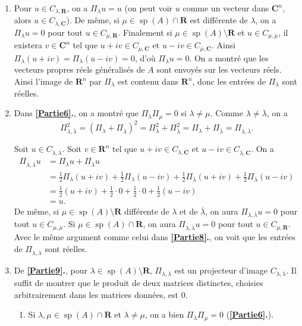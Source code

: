 \documentclass[french, 12pt]{article}
\theoremstyle{definition}
\newcommand{\ol}[1]{\overline{#1}}
\newcommand{\Cbb}{\mathbf{C}}
\newcommand{\Rbb}{\mathbf{R}}
\newcommand{\spec}{\operatorname{sp}}
\begin{document}
\begin{enumerate}
    \item \label{Partie8} Pour $u \in C_{\lambda, \Rbb}$, on a $\Pi_\lambda u = u$ (on peut voir $u$ comme un vecteur dans $\Cbb^n$, alors $u \in C_{\lambda,\Cbb}$). De m\^eme, si $\mu \in 
    \spec(A) \cap \Rbb$ est diff\'erente de $\lambda$, on a $\Pi_\lambda u = 0$ pour tout $u \in C_{\mu,\Rbb}$. Finalement si $\mu \in \spec(A) \setminus \Rbb$ et $u \in C_{\mu,\ol{\mu}}$, il existera $v \in \Cbb^n$ tel que $u + iv \in C_{\mu,\Cbb}$ et $u - iv \in C_{\ol{\mu},\Cbb}$. Ainsi $\Pi_\lambda(u + iv) = \Pi_\lambda(u - iv) = 0$,  d'o\`u $\Pi_\lambda u = 0$. On a montr\'e que les vecteurs propres r\'eels g\'en\'eralis\'es de $A$ sont envoy\'es sur les vecteurs r\'eels. Ainsi l'image de $\Rbb^n$ par $\Pi_\lambda$ est contenu dans $\Rbb^n$, donc les entr\'ees de $\Pi_\lambda$ sont r\'eelles.
    
    \item \label{Partie9} Dans {\bf \ref{Partie6}.}, on a montr\'e que $\Pi_\lambda \Pi_\mu = 0$ si $\lambda \neq \mu$. Comme $\lambda \neq \ol{\lambda}$, on a
        $$\Pi_{\lambda,\ol{\lambda}}^2 = (\Pi_\lambda + \Pi_{\ol{\lambda}})^2 = \Pi_\lambda^2 + \Pi_{\ol{\lambda}}^2 =  \Pi_\lambda + \Pi_{\ol{\lambda}} = \Pi_{\lambda,\ol{\lambda}}.$$
        
    Soit $u \in C_{\lambda,\ol{\lambda}}$. Soit $v \in \Rbb^n$ tel que $u + iv \in C_{\lambda,\Cbb}$ et $u - iv \in C_{\ol{\lambda},\Cbb}$. On a
        \begin{align*}
         \Pi_{\lambda,\ol{\lambda}} u & = \Pi_\lambda u + \Pi_{\ol{\lambda}} u \\
          & = \frac{1}{2}\Pi_\lambda(u + iv) + \frac{1}{2}\Pi_\lambda(u - iv) + \frac{1}{2}\Pi_{\ol{\lambda}}(u + iv) + \frac{1}{2}\Pi_{\ol{\lambda}}(u - iv)\\
          & = \frac{1}{2}(u + iv) + \frac{1}{2} \cdot 0 + \frac{1}{2} \cdot 0 + \frac{1}{2}( u -iv) \\
          & = u.
        \end{align*}
    De m\^eme, si $\mu \in \spec(A) \setminus \Rbb$ diff\'erente de $\lambda$ et de $\ol{\lambda}$, on aura $\Pi_{\lambda,\ol{\lambda}} u = 0$ pour tout $u \in C_{\mu,\ol{\mu}}$. Si $\mu \in \spec(A) \cap \Rbb$, on aura $\Pi_{\lambda,\ol{\lambda}} u = 0$ pour tout $u \in C_{\mu,\Rbb}$. Avec le m\^eme argument comme celui dans {\bf \ref{Partie8}.}, on voit que les entr\'ees de $\Pi_{\lambda,\ol{\lambda}}$ sont r\'eelles.
    
    \item \label{Partie10} De {\bf \ref{Partie9}.}, pour $\lambda \in \spec(A) \setminus \Rbb$, $\Pi_{\lambda,\ol{\lambda}}$ est un projecteur d'image $C_{\lambda,\ol{\lambda}}$. Il suffit de montrer que le produit de deux matrices distinctes, choisies arbitrairement dans les matrices donn\'ees, est $0$.
    \begin{enumerate} 
        \item Si $\lambda,\mu \in \spec(A) \cap \Rbb$ et $\lambda \neq \mu$, on a bien $\Pi_\lambda \Pi_\mu = 0$ ({\bf \ref{Partie6}.}).
        

\end{enumerate}
\end{enumerate}
\end{document}
